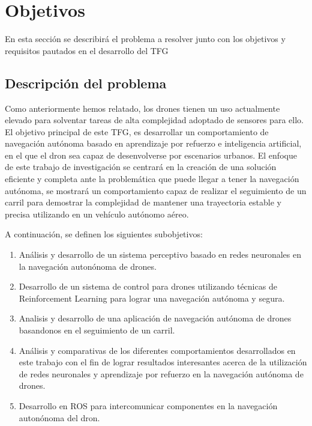 \chapter{Objetivos}
\label{cap:capitulo2}


En esta sección se describirá el problema a resolver junto con los objetivos y requisitos pautados en el desarrollo del TFG


\section{Descripción del problema}
\label{sec:descripcion}

Como anteriormente hemos relatado, los drones tienen un uso actualmente elevado para solventar tareas de alta complejidad adoptado de sensores 
para ello. El objetivo principal de este TFG, es desarrollar un comportamiento de navegación autónoma basado en aprendizaje por refuerzo e 
inteligencia artificial, en el que el dron sea capaz de desenvolverse por escenarios urbanos. El enfoque de este trabajo de investigación 
se centrará en la creación de una solución eficiente y completa ante la problemática que puede llegar a tener la navegación autónoma, se 
mostrará un comportamiento capaz de realizar el seguimiento de un carril para demostrar la complejidad de mantener una trayectoria estable 
y precisa utilizando en un vehículo autónomo aéreo. 

A continuación, se definen los siguientes subobjetivos: 

\begin{enumerate}
    \item Análisis y desarrollo de un sistema perceptivo basado en redes neuronales en la navegación autonónoma de drones.
    \item Desarrollo  de un sistema de control para drones utilizando técnicas de Reinforcement Learning para lograr una navegación 
    autónoma y segura.
    \item Analisis y desarrollo de una aplicación de navegación autónoma de drones basandonos en el seguimiento de un carril.
    \item Análisis y comparativas de los diferentes comportamientos desarrollados en este trabajo con el fin de 
    lograr resultados interesantes acerca de la utilización de redes neuronales y aprendizaje por refuerzo en la navegación autónoma de drones.
    \item Desarrollo en ROS para intercomunicar componentes en la navegación autonónoma del dron.
\end{enumerate}
\newpage
